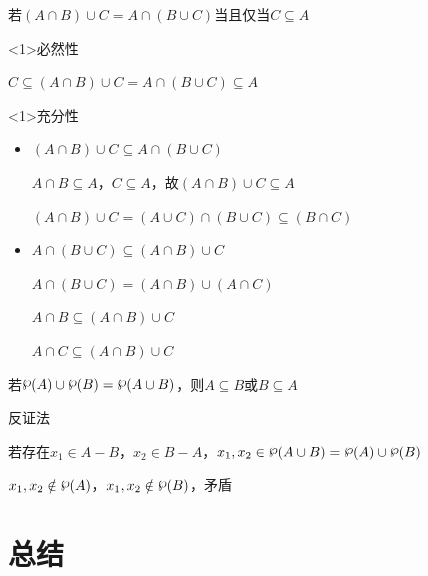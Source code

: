 \documentclass[xetex,10pt,aspectratio=43]{beamer}
\newcommand{\powerset}{\raisebox{.15\baselineskip}{\ensuremath{\wp}}}
\begin{document}
	\begin{frame}{若$(A\cap B)\cup C=A\cap(B\cup C)$当且仅当$C\subseteq A$}
	
	\begin{block}{必然性}
		
	$C\subseteq (A\cap B)\cup C=A\cap(B\cup C)\subseteq A$
		
	\end{block}

	\begin{block}{充分性}
	
	\begin{itemize}
		
		\item<1> $(A\cap B)\cup C\subseteq A\cap(B\cup C)$

		$A\cap B\subseteq A$，$C\subseteq A$，故$(A\cap B)\cup C\subseteq A$
		
		$(A\cap B)\cup C=(A\cup C)\cap(B\cup C)\subseteq(B\cap C)$
				
		\item<1> $A\cap(B\cup C)\subseteq (A\cap B)\cup C$
		
		$A\cap(B\cup C)=(A\cap B)\cup(A\cap C)$
		
		$A\cap B\subseteq(A\cap B)\cup C$
		
		$A\cap C\subseteq(A\cap B)\cup C$
		
	\end{itemize}
	
	\end{block}
		
	\end{frame}

	\begin{frame}{若$\powerset(A)\cup\powerset(B)=\powerset(A\cup B)$，则$A\subseteq B$或$B\subseteq A$}
	
	反证法
	
	若存在$x_1\in A-B$，$x_2\in B-A$，${x_1,x_2}\in \powerset(A\cup B)=\powerset(A)\cup\powerset(B)$
	
	${x_1,x_2}\notin \powerset(A)$，${x_1,x_2}\notin \powerset(B)$，矛盾
		
	\end{frame}

	\section{总结}
	
\end{document}
